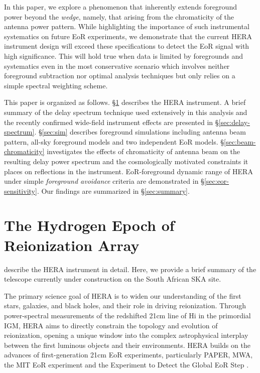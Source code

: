 \documentclass[preprint2,iop,numberedappendix,twocolappendix,appendixfloats]{emulateapj}
\begin{document}
In this paper, we explore a phenomenon that inherently extends foreground power beyond the {\it wedge}, namely, that arising from the chromaticity of the antenna power pattern. While highlighting the importance of such instrumental systematics on future EoR experiments, we demonstrate that the current HERA instrument design will exceed these specifications to detect the EoR signal with high significance. This will hold true when data is limited by foregrounds and systematics even in the most conservative scenario which involves neither foreground subtraction nor optimal analysis techniques but only relies on a simple spectral weighting scheme. 

This paper is organized as follows. \S\ref{sec:HERA} describes the HERA instrument. A brief summary of the delay spectrum technique used extensively in this analysis and the recently confirmed wide-field instrument effects are presented in \S\ref{sec:delay-spectrum}. \S\ref{sec:sim} describes foreground simulations including antenna beam pattern, all-sky foreground models and two independent EoR models. \S\ref{sec:beam-chromaticity} investigates the effects of chromaticity of antenna beam on the resulting delay power spectrum and the cosmologically motivated constraints it places on reflections in the instrument. EoR-foreground dynamic range of HERA under simple {\it foreground avoidance} criteria are demonstrated in \S\ref{sec:eor-sensitivity}. Our findings are summarized in \S\ref{sec:summary}.

\section{The Hydrogen Epoch of Reionization Array}\label{sec:HERA}

\citet{deb16} describe the HERA instrument in detail. Here, we provide a brief summary of the telescope currently under construction on the South African SKA site.

The primary science goal of HERA is to widen our understanding of the first stars, galaxies, and black holes, and their role in driving reionization. Through power-spectral measurements of the redshifted 21cm line of H{\sc i} in the primordial IGM, HERA aims to directly constrain the topology and evolution of reionization, opening a unique window into the complex astrophysical interplay between the first luminous objects and their environments. HERA builds on the advances of first-generation 21cm EoR experiments, particularly PAPER, MWA, the MIT EoR experiment \citep[MITEoR;][]{zhe14} and the Experiment to Detect the Global EoR Step \citep[EDGES;][]{bow10}.
\end{document}
